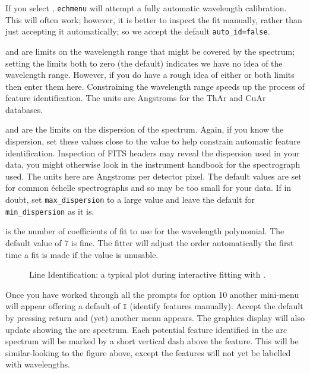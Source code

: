 If you select
,
\verb+echmenu+ will attempt a fully automatic wavelength calibration.
This will often work; however, it is better to
inspect the fit manually, rather than just accepting it automatically;
so we accept the default \verb+auto_id=false+\@.

 and
 are limits on the wavelength
range that might be covered by the spectrum; setting the limits both to
zero (the default) indicates we have no idea of the wavelength range.
However, if you do have a rough idea of either or both limits then enter
them here.
Constraining the wavelength range speeds up the process of feature
identification.
The units are Angstroms for the ThAr and CuAr databases.

 and
 are the limits on the
dispersion of the spectrum.  Again, if you know the dispersion, set these
values close to the value to help constrain automatic feature identification.
Inspection of FITS headers may reveal the dispersion used in your data,
you might otherwise look in the instrument handbook for the spectrograph
used.
The units here are Angstroms per detector pixel.  The default values are
set for common \'{e}chelle spectrographs and so may be too small for your
data.  If in doubt, set \verb+max_dispersion+ to a large value and leave
the default for \verb+min_dispersion+ as it is.

 is the number of coefficients
of fit to use for the wavelength polynomial.
The default value of 7 is fine.
The fitter will adjust the order automatically the first time a fit is
made if the value is unusable.

\begin{htmlonly}
\begin{figure}
\begin{center}
\leavevmode\epsfysize=136mm

\parbox{140mm}{
\caption{Line Identification: a typical plot during interactive fitting
         with .}
\label{fi_echarc_plot_again}
}
\end{center}
\end{figure}
\end{htmlonly}

Once you have worked through all the prompts for option 10 another mini-menu
will appear offering a default of \verb+I+ (identify features manually).
Accept the default by pressing return and (yet) another menu appears.  The
graphics display will also update showing the arc spectrum.  Each potential
feature identified in the arc spectrum will be marked by a short vertical
dash above the feature.  This will be similar-looking to
{the figure above,} except the features
will not yet be labelled with wavelengths.

